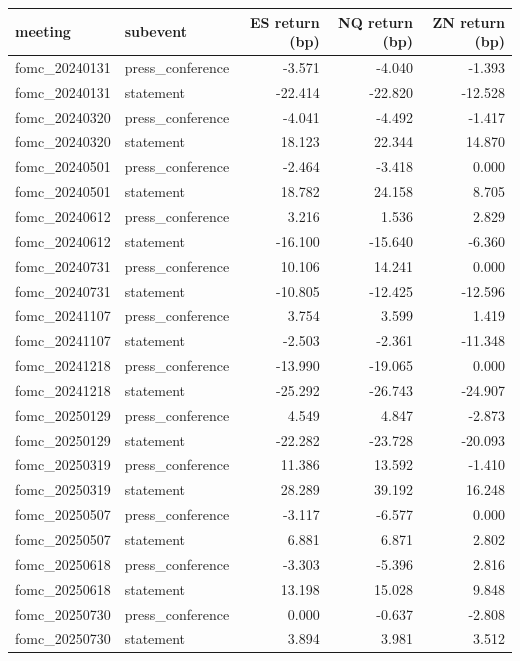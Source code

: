 \begin{tabular}{llrrr}
\toprule
meeting & subevent & ES return (bp) & NQ return (bp) & ZN return (bp) \\
\midrule
fomc_20240131 & press_conference & -3.571 & -4.040 & -1.393 \\
fomc_20240131 & statement & -22.414 & -22.820 & -12.528 \\
fomc_20240320 & press_conference & -4.041 & -4.492 & -1.417 \\
fomc_20240320 & statement & 18.123 & 22.344 & 14.870 \\
fomc_20240501 & press_conference & -2.464 & -3.418 & 0.000 \\
fomc_20240501 & statement & 18.782 & 24.158 & 8.705 \\
fomc_20240612 & press_conference & 3.216 & 1.536 & 2.829 \\
fomc_20240612 & statement & -16.100 & -15.640 & -6.360 \\
fomc_20240731 & press_conference & 10.106 & 14.241 & 0.000 \\
fomc_20240731 & statement & -10.805 & -12.425 & -12.596 \\
fomc_20241107 & press_conference & 3.754 & 3.599 & 1.419 \\
fomc_20241107 & statement & -2.503 & -2.361 & -11.348 \\
fomc_20241218 & press_conference & -13.990 & -19.065 & 0.000 \\
fomc_20241218 & statement & -25.292 & -26.743 & -24.907 \\
fomc_20250129 & press_conference & 4.549 & 4.847 & -2.873 \\
fomc_20250129 & statement & -22.282 & -23.728 & -20.093 \\
fomc_20250319 & press_conference & 11.386 & 13.592 & -1.410 \\
fomc_20250319 & statement & 28.289 & 39.192 & 16.248 \\
fomc_20250507 & press_conference & -3.117 & -6.577 & 0.000 \\
fomc_20250507 & statement & 6.881 & 6.871 & 2.802 \\
fomc_20250618 & press_conference & -3.303 & -5.396 & 2.816 \\
fomc_20250618 & statement & 13.198 & 15.028 & 9.848 \\
fomc_20250730 & press_conference & 0.000 & -0.637 & -2.808 \\
fomc_20250730 & statement & 3.894 & 3.981 & 3.512 \\
\bottomrule
\end{tabular}
